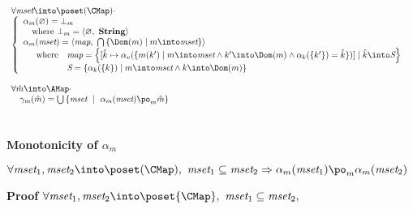 $\begin{array}{l}
\forall \emph{mset} \into \poset(\CMap) \cdot \\
\left \{
\begin{array}{l}
\alpha_m(\varnothing) = \bot_m \\
\quad \textrm{where } \bot_m = \langle \varnothing,\ \textbf{String} \rangle \\
\alpha_m(\emph{mset}) =
\langle \emph{map},\ \bigcap \left \{ \Dom(m) \mid m \into \emph{mset} \right \} \rangle \\
\quad \begin{array}{ll}\textrm{where} 
& \emph{map} = \left \{
[ \hat{k} \mapsto \alpha_{v}( \{ m(k') \mid m \into \emph{mset}
\land k' \into \Dom(m) \land \alpha_k(\{k'\}) = \hat{k} \} ) ]
\mid \hat{k} \into \emph{S}  \right \} \\
& \emph{S} = \left \{ 
\alpha_k(\{k\}) \mid m \into \emph{mset} \land k \into \Dom(m) \right \}\\
\end{array}\\
\end{array} \right. \\\\

\forall \hat{m} \into \AMap \cdot \\
\quad \gamma_{m}(\hat{m}) = \bigcup \left \{ \emph{mset} ~\mid~
\alpha_{m}(\emph{mset}) \po_m \hat{m} \right \} \\
\end{array}$\\\\\\
\textbf{Monotonicity of $\alpha_m$}
\begin{center}
$\forall \emph{mset}_1, \emph{mset}_2 \into \poset(\CMap), ~
\emph{mset}_1 \subseteq \emph{mset}_2
\Rightarrow
\alpha_m(\emph{mset}_1) \po_m \alpha_m(\emph{mset}_2)$
\end{center}
\textbf{Proof } 
$\forall \emph{mset}_1, \emph{mset}_2 \into \poset{\CMap},~
\emph{mset}_1 \subseteq \emph{mset}_2, ~$
